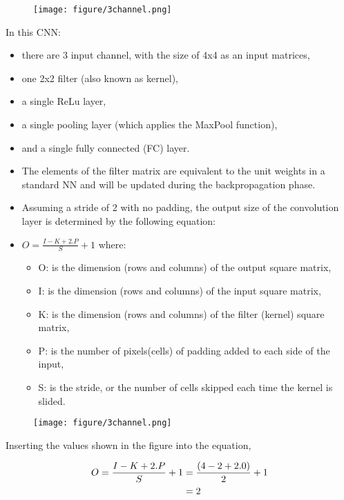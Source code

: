 \begin{vbframe}

 \begin{figure}
    \centering
    \texttt{[image: figure/3channel.png]}
  \end{figure}

In this CNN:
    \begin{itemize}
       \item there are 3 input channel, with the size of 4x4 as an input matrices, 
       \item one 2x2 filter (also known as kernel), 
       \item a single ReLu layer,
       \item a single pooling layer (which applies the MaxPool function),
       \item and a single fully connected (FC) layer.
    \end{itemize}

    \begin{itemize}
       \item The elements of the filter matrix are equivalent to the unit weights in a standard NN and will be updated during the backpropagation phase.
       \item Assuming a stride of 2 with no padding, the output size of the convolution layer is determined by the following equation:
       \item $ O = \frac{I - K + 2.P}{S} + 1$ where: 
    \begin{itemize}
       \item O: is the dimension (rows and columns) of the output square matrix, 
       \item I: is the dimension (rows and columns) of the input square matrix,
       \item K: is the dimension (rows and columns) of the filter (kernel) square matrix, 
       \item P: is the number of pixels(cells) of padding added to each side of the input,
       \item S: is the stride, or the number of cells skipped each time the kernel is slided.
    \end{itemize}
    \end{itemize}

 \begin{figure}
    \centering
    \texttt{[image: figure/3channel.png]}
  \end{figure}

Inserting the values shown in the figure into the equation,

\begin{align} 
O= \frac{I - K + 2.P}{S} + 1&={(4 - 2 + 2.0)\over 2} + 1\\ 
&=2 
\end{align}

\end{vbframe}


